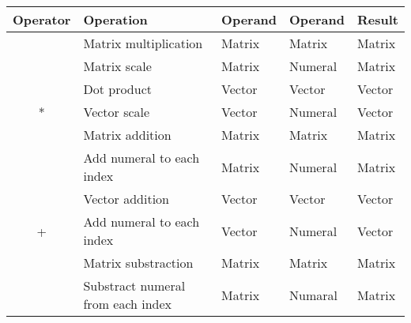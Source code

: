 \begin{table}[ht]
\centering
\begin{tabular}{|c|l|l|l|l|}
\hline
\textbf{Operator}   & \textbf{Operation}                        & \textbf{Operand}                 & \textbf{Operand}                  & \textbf{Result}                 \\ \hline
                    & \cellcolor{gray!40}Matrix multiplication  & \cellcolor{gray!40}Matrix        & \cellcolor{gray!40}Matrix         & \cellcolor{gray!40}Matrix       \\ \cline{2-5}
                    & Matrix scale                              & Matrix                           & Numeral                           & Matrix                          \\ \cline{2-5}
                    & \cellcolor{gray!40}Dot product            & \cellcolor{gray!40}Vector        & \cellcolor{gray!40}Vector         & \cellcolor{gray!40}Vector       \\ \cline{2-5}
\multirow{-4}{*}{*} & Vector scale                              & Vector                           & Numeral                           & Vector                          \\ \hline
                    & \cellcolor{gray!40}Matrix addition        & \cellcolor{gray!40}Matrix        & \cellcolor{gray!40}Matrix         & \cellcolor{gray!40}Matrix       \\ \cline{2-5}
                    & Add numeral to each index                 & Matrix                           & Numeral                           & Matrix                          \\ \cline{2-5}
                    & \cellcolor{gray!40}Vector addition        & \cellcolor{gray!40}Vector        & \cellcolor{gray!40}Vector         & \cellcolor{gray!40}Vector       \\ \cline{2-5}
\multirow{-4}{*}{+} & Add numeral to each index                 & Vector                           & Numeral                           & Vector                          \\ \hline
                    & \cellcolor{gray!40}Matrix substraction    & \cellcolor{gray!40}Matrix        & \cellcolor{gray!40}Matrix         & \cellcolor{gray!40}Matrix       \\ \cline{2-5}
                    & Substract numeral from each index         & Matrix                           & Numaral                           & Matrix                          \\ \cline{2-5}

\end{tabular}
\end{table}
